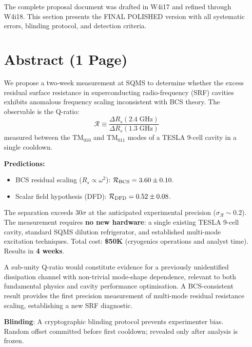 \documentclass[11pt]{article}
\newcommand{\Rq}{\mathcal{R}}
\begin{document}
The complete proposal document was drafted in W4i17 and refined through
W4i18. This section presents the FINAL POLISHED version with all
systematic errors, blinding protocol, and detection criteria.

\section{Abstract (1 Page)}
\label{sec:abstract}

We propose a two-week measurement at SQMS to determine whether the
excess residual surface resistance in superconducting radio-frequency
(SRF) cavities exhibits anomalous frequency scaling inconsistent with
BCS theory. The observable is the Q-ratio:
\begin{equation}
\Rq \equiv \frac{\Delta R_s(2.4\;\text{GHz})}{\Delta R_s(1.3\;\text{GHz})}
\end{equation}
measured between the TM$_{010}$ and TM$_{011}$ modes of a TESLA 9-cell
cavity in a single cooldown.

\textbf{Predictions:}
\begin{itemize}[nosep]
\item BCS residual scaling ($R_s \propto \omega^2$):
  $\Rq_{\rm BCS} = 3.60 \pm 0.10$.
\item Scalar field hypothesis (DFD):
  $\Rq_{\rm DFD} = 0.52 \pm 0.08$.
\end{itemize}

The separation exceeds $30\sigma$ at the anticipated experimental
precision ($\sigma_{\Rq} \sim 0.2$). The measurement requires
\textbf{no new hardware}: a single existing TESLA 9-cell cavity,
standard SQMS dilution refrigerator, and established multi-mode
excitation techniques. Total cost: \textbf{\$50K} (cryogenics
operations and analyst time). Results in \textbf{4 weeks}.

A sub-unity Q-ratio would constitute evidence for a previously
unidentified dissipation channel with non-trivial mode-shape
dependence, relevant to both fundamental physics and cavity
performance optimisation. A BCS-consistent result provides the
first precision measurement of multi-mode residual resistance
scaling, establishing a new SRF diagnostic.

\textbf{Blinding}: A cryptographic blinding protocol prevents
experimenter bias. Random offset committed before first cooldown;
revealed only after analysis is frozen.
\end{document}
